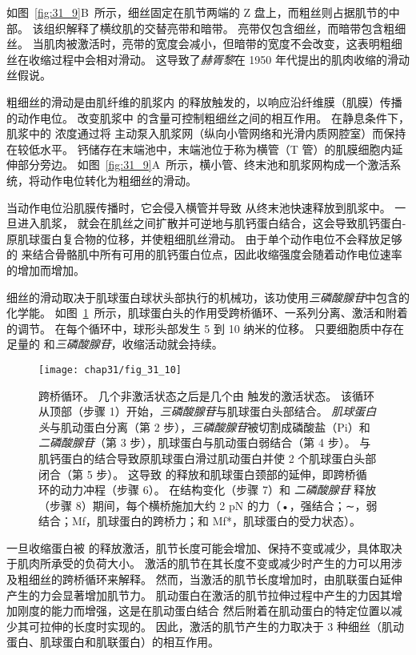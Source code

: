 如图~\ref{fig:31_9}B~所示，细丝固定在肌节两端的 Z 盘上，而粗丝则占据肌节的中部。
该组织解释了横纹肌的交替亮带和暗带。
亮带仅包含细丝，而暗带包含粗细丝。
当肌肉被激活时，亮带的宽度会减小，但暗带的宽度不会改变，这表明粗细丝在收缩过程中会相对滑动。
这导致了\textit{赫胥黎}在 1950 年代提出的肌肉收缩的滑动丝假说。


粗细丝的滑动是由肌纤维的肌浆内  的释放触发的，以响应沿纤维膜（肌膜）传播的动作电位。
改变肌浆中  的含量可控制粗细丝之间的相互作用。
在静息条件下，肌浆中的  浓度通过将  主动泵入肌浆网（纵向小管网络和光滑内质网腔室）而保持在较低水平。
钙储存在末端池中，末端池位于称为横管（T 管）的肌膜细胞内延伸部分旁边。
如图~\ref{fig:31_9}A~所示，横小管、终末池和肌浆网构成一个激活系统，将动作电位转化为粗细丝的滑动。


当动作电位沿肌膜传播时，它会侵入横管并导致  从终末池快速释放到肌浆中。
一旦进入肌浆， 就会在肌丝之间扩散并可逆地与肌钙蛋白结合，这会导致肌钙蛋白-原肌球蛋白复合物的位移，并使粗细肌丝滑动。
由于单个动作电位不会释放足够的  来结合骨骼肌中所有可用的肌钙蛋白位点，因此收缩强度会随着动作电位速率的增加而增加。


细丝的滑动取决于肌球蛋白球状头部执行的机械功，该功使用\textit{三磷酸腺苷}中包含的化学能。
如图~\ref{fig:31_10}~所示，肌球蛋白头的作用受跨桥循环、一系列分离、激活和附着的调节。
在每个循环中，球形头部发生 5 到 10 纳米的位移。
只要细胞质中存在足量的 和\textit{三磷酸腺苷}，收缩活动就会持续。


\begin{figure}[htbp]
	\centering
	\texttt{[image: chap31/fig\_31\_10]}
	\caption{跨桥循环。
	几个非激活状态之后是几个由  触发的激活状态。
	该循环从顶部（步骤 1）开始，\textit{三磷酸腺苷}与肌球蛋白头部结合。
	\textit{肌球蛋白头}与肌动蛋白分离（第 2 步），\textit{三磷酸腺苷}被切割成磷酸盐（Pi）和\textit{二磷酸腺苷}（第 3 步），肌球蛋白与肌动蛋白弱结合（第 4 步）。
	  与肌钙蛋白的结合导致原肌球蛋白滑过肌动蛋白并使 2 个肌球蛋白头部闭合（第 5 步）。
	这导致  的释放和肌球蛋白颈部的延伸，即跨桥循环的动力冲程（步骤 6）。
	在结构变化（步骤 7）和 \textit{二磷酸腺苷} 释放（步骤 8）期间，每个横桥施加大约 2 pN 的力（•，强结合；∼，弱结合；Mf，肌球蛋白的跨桥力；和 Mf*，肌球蛋白的受力状态）\cite{gordon2001skeletal}。}
	\label{fig:31_10}
\end{figure}


一旦收缩蛋白被  的释放激活，肌节长度可能会增加、保持不变或减少，具体取决于肌肉所承受的负荷大小。
激活的肌节在其长度不变或减少时产生的力可以用涉及粗细丝的跨桥循环来解释。
然而，当激活的肌节长度增加时，由肌联蛋白延伸产生的力会显著增加肌节力。
肌动蛋白在激活的肌节拉伸过程中产生的力因其增加刚度的能力而增强，这是在肌动蛋白结合  然后附着在肌动蛋白的特定位置以减少其可拉伸的长度时实现的。
因此，激活的肌节产生的力取决于 3 种细丝（肌动蛋白、肌球蛋白和肌联蛋白）的相互作用。



